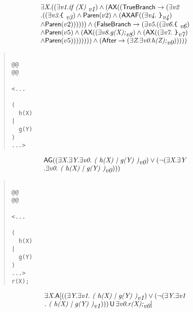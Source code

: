 \documentclass{article}
\newcommand{\U}{\,\mbox{\sf{U}}\,}
\newcommand{\A}{\mbox{\sf{A}}}
\newcommand{\AX}{\mbox{\sf{AX}}}
\newcommand{\AF}{\mbox{\sf{AF}}}
\newcommand{\AG}{\mbox{\sf{AG}}}
\newcommand{\mita}[1]{\mbox{\it{{#1}}}}
\newcommand{\msf}[1]{\mbox{\sf{{#1}}}}
\newcommand{\ttlb}{\mbox{\tt \char'173}}
\newcommand{\ttrb}{\mbox{\tt \char'175}}
\begin{document}
\[\begin{array}{l}
\exists \mita{X} . ((\exists \mita{v1} . \mita{if (X) }_{\mita{v1}}) \wedge (\AX((\msf{TrueBranch} \rightarrow (\exists \mita{v2}\\ . ((\exists \mita{v3} . \mita{{\ttlb}
  }_{\mita{v3}}) \wedge \msf{Paren}(v2) \wedge (\AX\AF((\exists \mita{v4} . \mita{
{\ttrb}}_{\mita{v4}})\\ \wedge \msf{Paren}(v2)))))) \wedge (\msf{FalseBranch} \rightarrow (\exists \mita{v5} . ((\exists \mita{v6} . \mita{{\ttlb}
  }_{\mita{v6}})\\ \wedge \msf{Paren}(v5) \wedge (\AX((\exists \mita{v8} . \mita{g(X);}_{\mita{v8}}) \wedge (\AX((\exists \mita{v7} . \mita{
{\ttrb}}_{\mita{v7}})\\ \wedge \msf{Paren}(v5)))))))) \wedge (\msf{After} \rightarrow (\exists \mita{Z} . \exists \mita{v0} . \mita{h(Z);}_{\mita{v0}})))))
\end{array}\]

\begin{quote}\begin{verbatim}

@@
@@

<...
  
(
  h(X)
|
  g(Y)
)
...>
\end{verbatim}\end{quote}

\[\begin{array}{l}
\AG((\exists \mita{X} . \exists \mita{Y} . \exists \mita{v0} . \mita{
(
h(X)
|
g(Y)
)}_{\mita{v0}}) \vee (\neg (\exists \mita{X} . \exists \mita{Y}\\ . \exists \mita{v0} . \mita{
(
h(X)
|
g(Y)
)}_{\mita{v0}})))
\end{array}\]

\begin{quote}\begin{verbatim}

@@
@@

<...
  
(
  h(X)
|
  g(Y)
)
...>
r(X);
\end{verbatim}\end{quote}

\[\begin{array}{l}
\exists \mita{X} . \A[((\exists \mita{Y} . \exists \mita{v1} . \mita{
(
h(X)
|
g(Y)
)}_{\mita{v1}}) \vee (\neg (\exists \mita{Y} . \exists \mita{v1}\\ . \mita{
(
h(X)
|
g(Y)
)}_{\mita{v1}}))) \U \exists \mita{v0} . \mita{r(X);}_{\mita{v0}}]

\end{array}\]
\end{document}
